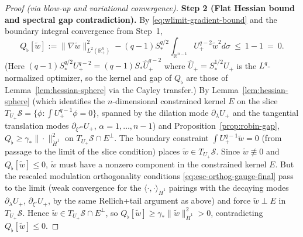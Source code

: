 \documentclass[10pt,a4paper]{amsart}
\newcommand{\R}{\mathbb{R}}
\begin{document}
\begin{proof}[Proof (via blow-up and variational convergence)]
\smallskip\noindent\textbf{Step 2 (Flat Hessian bound and spectral gap contradiction).}
By \eqref{eq:wlimit-gradient-bound} and the boundary integral convergence from Step~1,
\[
Q_\flat[\widetilde w]
:=\|\nabla\widetilde w\|_{L^2(\R^n_+)}^2
  -(q-1)S_\ast^{q/2}\int_{\R^{n-1}}U_+^{q-2}\widetilde w^2d\sigma
\ \le\ 1-1\ =\ 0.
\]
(Here $(q-1)S_\ast^{q/2}U_+^{q-2}=(q-1)S_\ast\hat U_+^{q-2}$
where $\hat U_+=S_\ast^{1/2}U_+$ is the $L^q$-normalized optimizer,
so the kernel and gap of $Q_\flat$ are those of
Lemma~\ref{lem:hessian-sphere} via the Cayley transfer.)
By Lemma~\ref{lem:hessian-sphere}
(which identifies the $n$-dimensional constrained kernel $E$
on the slice $T_{U_+}\mathcal S=\{\phi:\int U_+^{q-1}\phi=0\}$,
spanned by the dilation mode $\partial_\lambda U_+$ and the
tangential translation modes $\partial_{\xi'^\alpha}U_+$,
$\alpha=1,\dots,n-1$)
and Proposition~\ref{prop:robin-gap},
$Q_\flat\ge\gamma_\ast\|\cdot\|_{\dot H^1}^2$
on $T_{U_+}\mathcal S\cap E^\perp$.
The boundary constraint $\int U_+^{q-1}\widetilde w=0$
(from passage to the limit of the slice condition)
places $\widetilde w\in T_{U_+}\mathcal S$.
Since $\widetilde w\not\equiv0$ and
$Q_\flat[\widetilde w]\le0$,
$\widetilde w$ must have a nonzero component in the
constrained kernel $E$.
But the rescaled modulation orthogonality conditions
\eqref{eq:esc-orthog-gauge-final} pass to the limit
(weak convergence for the $\langle\cdot,\cdot\rangle_{\dot H^1}$
pairings with the decaying modes $\partial_\lambda U_+$,
$\partial_{\xi'}U_+$,
by the same Rellich+tail argument as above) and force
$\widetilde w\perp E$ in $T_{U_+}\mathcal S$.
Hence $\widetilde w\in T_{U_+}\mathcal S\cap E^\perp$, so
$Q_\flat[\widetilde w]\ge\gamma_\ast\|\widetilde w\|_{\dot H^1}^2>0$,
contradicting $Q_\flat[\widetilde w]\le0$.
\end{proof}
\end{document}
